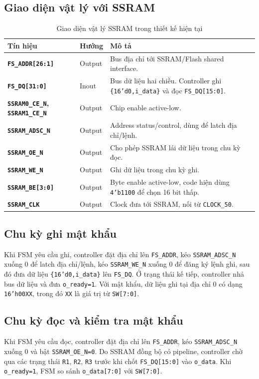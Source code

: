 \documentclass[13pt,a4paper]{article}
\begin{document}
\subsection{Giao diện vật lý với SSRAM}
\begin{table}[H]
\centering
\caption{Giao diện vật lý SSRAM trong thiết kế hiện tại}
\label{tab:ssram_phy}
\small
\begin{tabularx}{\textwidth}{|>{\bfseries}p{3.6cm}|p{1.7cm}|X|}
\hline
\textbf{Tín hiệu} & \textbf{Hướng} & \textbf{Mô tả}\\
\hline
\texttt{FS\_ADDR[26:1]} & Output & Bus địa chỉ tới SSRAM/Flash shared interface.\\
\hline
\texttt{FS\_DQ[31:0]} & Inout & Bus dữ liệu hai chiều. Controller ghi \texttt{\{16'd0,i\_data\}} và đọc \texttt{FS\_DQ[15:0]}.\\
\hline
\texttt{SSRAM0\_CE\_N}, \texttt{SSRAM1\_CE\_N} & Output & Chip enable active-low.\\
\hline
\texttt{SSRAM\_ADSC\_N} & Output & Address status/control, dùng để latch địa chỉ/lệnh.\\
\hline
\texttt{SSRAM\_OE\_N} & Output & Cho phép SSRAM lái dữ liệu trong chu kỳ đọc.\\
\hline
\texttt{SSRAM\_WE\_N} & Output & Ghi dữ liệu trong chu kỳ ghi.\\
\hline
\texttt{SSRAM\_BE[3:0]} & Output & Byte enable active-low, code hiện dùng \texttt{4'b1100} để chọn 16 bit thấp.\\
\hline
\texttt{SSRAM\_CLK} & Output & Clock đưa tới SSRAM, nối từ \texttt{CLOCK\_50}.\\
\hline
\end{tabularx}
\end{table}
\normalsize

\subsection{Chu kỳ ghi mật khẩu}
Khi FSM yêu cầu ghi, controller đặt địa chỉ lên \texttt{FS\_ADDR}, kéo \texttt{SSRAM\_ADSC\_N} xuống 0 để latch địa chỉ/lệnh, kéo \texttt{SSRAM\_WE\_N} xuống 0 để đăng ký lệnh ghi, sau đó đưa dữ liệu \texttt{\{16'd0,i\_data\}} lên \texttt{FS\_DQ}. Ở trạng thái kế tiếp, controller nhả bus dữ liệu và đưa \texttt{o\_ready=1}. Với mật khẩu, dữ liệu ghi tại địa chỉ 0 có dạng \texttt{16'h00XX}, trong đó \texttt{XX} là giá trị từ \texttt{SW[7:0]}.

\subsection{Chu kỳ đọc và kiểm tra mật khẩu}
Khi FSM yêu cầu đọc, controller đặt địa chỉ lên \texttt{FS\_ADDR}, kéo \texttt{SSRAM\_ADSC\_N} xuống 0 và bật \texttt{SSRAM\_OE\_N=0}. Do SSRAM đồng bộ có pipeline, controller chờ qua các trạng thái \texttt{R1}, \texttt{R2}, \texttt{R3} trước khi chốt \texttt{FS\_DQ[15:0]} vào \texttt{o\_data}. Khi \texttt{o\_ready=1}, FSM so sánh \texttt{o\_data[7:0]} với \texttt{SW[7:0]}.
\end{document}
